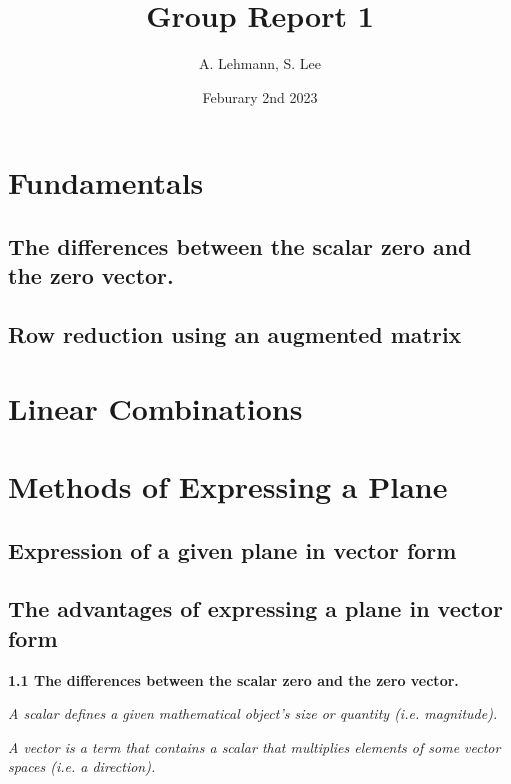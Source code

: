 \documentclass{article}
\title{Group Report 1}
\author{A. Lehmann, S. Lee}
\date{Feburary 2nd 2023}
\begin{document}
	
	\maketitle
	\section{Fundamentals}
	\subsection{The differences between the scalar zero and the zero vector.}
	\subsection{Row reduction using an augmented matrix}
	
	
	\section{Linear Combinations}
	
	\section{Methods of Expressing a Plane}
	\subsection{Expression of a given plane in vector form}
	\subsection{The advantages of expressing a plane in vector form}
	
	
	\clearpage
	
	
	\textbf{1.1 The differences between the scalar zero and the zero vector.}
	
	
	\textit{A scalar defines a given mathematical object's size or quantity (i.e. magnitude).}
	
	\textit{A vector is a term that contains a scalar that multiplies elements of some vector spaces (i.e. a direction).}
	
\end{document}
